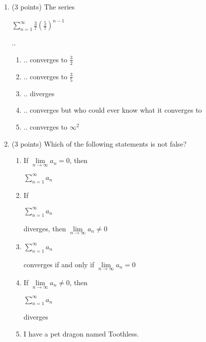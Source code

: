 \documentclass[paper=a4, fontsize=11pt]{scrartcl} %
\numberwithin{equation}{section} %
\numberwithin{figure}{section} %
\numberwithin{table}{section} %
\begin{document}
\begin{enumerate}
\item (3 points) The series \begin{large}$\sum\limits_{n=1}^\infty \frac{3}{7} \left( \frac{5}{7} \right)^{n-1}$ \end{large} ..
\vspace{2mm}
 \normalsize \begin{enumerate}
    \item .. converges to $\frac{3}{2}$
    \item .. converges to $\frac{3}{5}$
    \item .. diverges
    \item .. converges but who could ever know what it converges to
    \item .. converges to $\infty^2$
  \end{enumerate}
  \vspace{2.5in}
\item (3 points) Which of the following statements is not false?
\normalsize \begin{enumerate}
    \item If $\lim\limits_{n \rightarrow \infty} a_n = 0$, then  \begin{large}$\sum\limits_{n=1}^\infty a_n$ \end{large}
    \item If \begin{large}$\sum\limits_{n=1}^\infty a_n$ \end{large} diverges,  then $\lim\limits_{n \rightarrow \infty} a_n \neq 0$
    \item \begin{large}$\sum\limits_{n=1}^\infty a_n$ \end{large} converges if and only if $\lim\limits_{n \rightarrow \infty} a_n = 0$
    \item If $\lim\limits_{n \rightarrow \infty} a_n \neq 0$, then \begin{large}$\sum\limits_{n=1}^\infty a_n$ \end{large} diverges
    \item I have a pet dragon named Toothless.
  \end{enumerate}
\end{enumerate}



\end{document}
